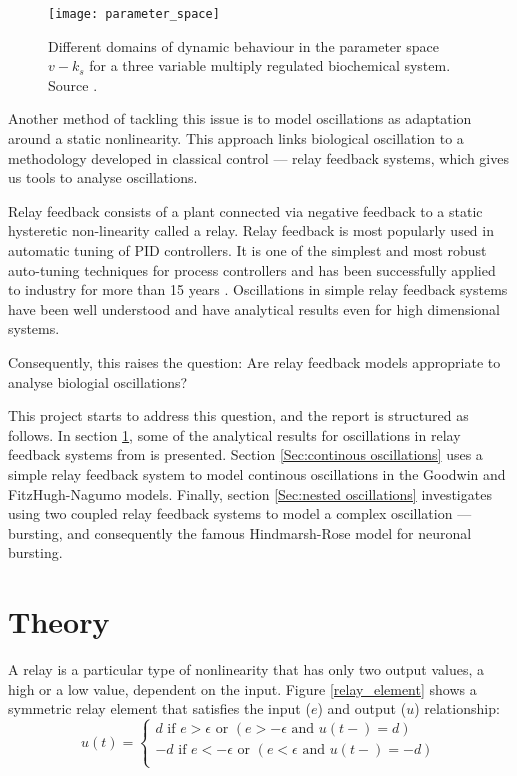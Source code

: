 \documentclass[a4paper, 12pt]{article}
\begin{document}
\begin{figure}[h!]
\texttt{[image: parameter\_space]}
\caption{Different domains of dynamic behaviour in the parameter space $v-k_s$ for a three variable multiply regulated biochemical system. Source \cite{goldbeter2}.}
\label{parameter_search}
\end{figure}

Another method of tackling this issue is to model oscillations as adaptation around a static nonlinearity. This approach links biological oscillation to a methodology developed in classical control --- relay feedback systems, which gives us tools to analyse oscillations.

Relay feedback consists of a plant connected via negative feedback to a static hysteretic non-linearity called a relay. Relay feedback is most popularly used in automatic tuning of PID controllers. It is one of the simplest and most robust auto-tuning techniques for process controllers and has been successfully applied to industry for more than 15 years \cite{hang}. Oscillations in simple relay feedback systems have been well understood and have analytical results even for high dimensional systems. 

Consequently, this raises the question: Are relay feedback models appropriate to analyse biologial oscillations? 
 
This project starts to address this question, and the report is structured as follows. In section \ref{Sec:theory}, some of the analytical results for oscillations in relay feedback systems from \cite{astrom1995} is presented. Section \ref{Sec:continous oscillations} uses a simple relay feedback system to model continous oscillations in the Goodwin and FitzHugh-Nagumo models. Finally, section \ref{Sec:nested oscillations} investigates using two coupled relay feedback systems to model a complex oscillation --- bursting, and consequently the famous Hindmarsh-Rose model for neuronal bursting.   

\section{Theory}\label{Sec:theory}
A relay is a particular type of nonlinearity that has only two output values, a high or a low value, dependent on the input. Figure \ref{relay_element} shows a symmetric relay element that satisfies the input ($e$) and output ($u$) relationship:
\begin{equation}
	u(t)=\begin{cases}
	               d \text{ if } e > \epsilon \text{ or } (e >-\epsilon \text{ and } u(t-) = d)\\
	                -d \text{ if } e < -\epsilon \text{ or } (e < \epsilon \text{ and } u(t-) = -d)\\
	              
	            \end{cases}
	            \label{eq:symmetric_relay_equation}
\end{equation}
\end{document}
